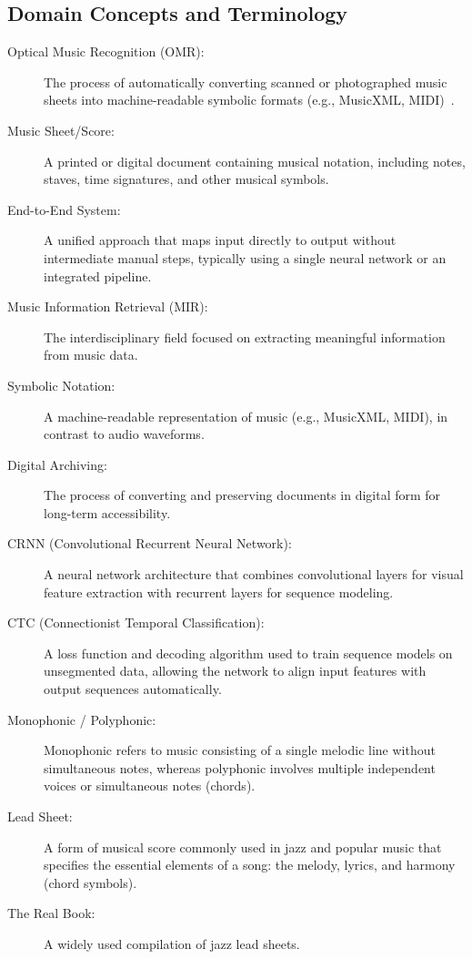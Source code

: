 \documentclass[11pt, a4paper]{article}
\begin{document}
\subsection{Domain Concepts and Terminology}
\begin{description}
    \item[Optical Music Recognition (OMR):] The process of automatically converting scanned or photographed music sheets into machine-readable symbolic formats (e.g., MusicXML, MIDI)~\cite{shatriOPTICALMUSICRECOGNITION}.
    \item[Music Sheet/Score:] A printed or digital document containing musical notation, including notes, staves, time signatures, and other musical symbols.
    \item[End-to-End System:] A unified approach that maps input directly to output without intermediate manual steps, typically using a single neural network or an integrated pipeline.
    \item[Music Information Retrieval (MIR):] The interdisciplinary field focused on extracting meaningful information from music data.
    \item[Symbolic Notation:] A machine-readable representation of music (e.g., MusicXML, MIDI), in contrast to audio waveforms.
    \item[Digital Archiving:] The process of converting and preserving documents in digital form for long-term accessibility.
    \item[CRNN (Convolutional Recurrent Neural Network):] A neural network architecture that combines convolutional layers for visual feature extraction with recurrent layers for sequence modeling.
    \item[CTC (Connectionist Temporal Classification):] A loss function and decoding algorithm used to train sequence models on unsegmented data, allowing the network to align input features with output sequences automatically.
    \item[Monophonic / Polyphonic:] Monophonic refers to music consisting of a single melodic line without simultaneous notes, whereas polyphonic involves multiple independent voices or simultaneous notes (chords).
    \item[Lead Sheet:] A form of musical score commonly used in jazz and popular music that specifies the essential elements of a song: the melody, lyrics, and harmony (chord symbols).
    \item[The Real Book:] A widely used compilation of jazz lead sheets.
\end{description}
\end{document}
